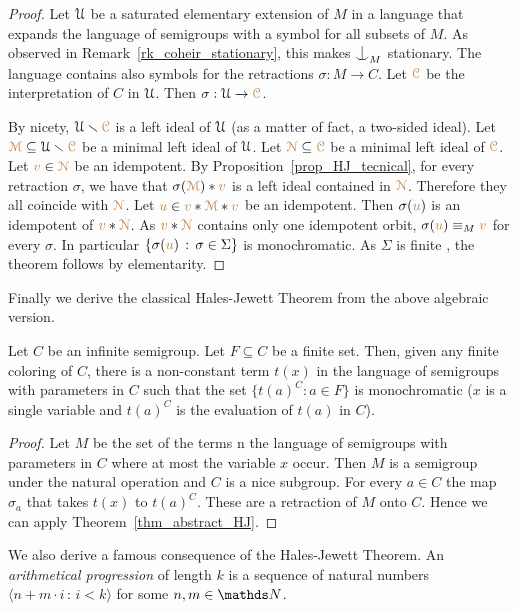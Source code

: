 \begin{proof}
Let $\EuScript U$ be a saturated elementary extension of $M$ in a language that expands the language of semigroups with a symbol for all subsets of $M$.
As observed in Remark~\ref{rk_coheir_stationary}, this makes $\nonfork_M$ stationary.
The language contains also symbols for the retractions $\sigma:M\to C$.
Let ${\color{brown}\EuScript C}$ be the interpretation of $C$ in $\EuScript U$.
Then $\sigma:\EuScript U\to{\color{brown}\EuScript C}$.

By nicety, $\EuScript U\smallsetminus{\color{brown}\EuScript C}$ is a left ideal of $\EuScript U$ (as a matter of fact, a two-sided ideal).
Let ${\color{brown}\EuScript M}\subseteq \EuScript U\smallsetminus{\color{brown}\EuScript C}$ be a minimal left ideal of $\EuScript U$.
Let ${\color{brown}\EuScript N}\subseteq{\color{brown}\EuScript C}$ be a minimal left ideal of ${\color{brown}\EuScript C}$.
Let ${\color{brown} v}\in{\color{brown}\EuScript N}$ be an idempotent.
By Proposition~\ref{prop_HJ_tecnical}, for every retraction $\sigma$, we have that $\sigma({\color{brown}\EuScript M})*{\color{brown} v}$ is a left ideal contained in ${\color{brown}\EuScript N}$.
Therefore they all coincide with ${\color{brown}\EuScript N}$.
Let ${\color{brown} u}\in{\color{brown}v}*{\color{brown}\EuScript M}*{\color{brown} v}$ be an idempotent.
Then $\sigma({\color{brown} u})$ is an idempotent of ${\color{brown} v}*{\color{brown}\EuScript N}$.
As ${\color{brown} v}*{\color{brown}\EuScript N}$ contains only one idempotent orbit, $\sigma({\color{brown} u})\equiv_M{\color{brown} v}$ for every $\sigma$.
In particular $\{\sigma({\color{brown} u})\,:\,\sigma\in\Sigma\}$ is monochromatic.
As $\Sigma$ is finite , the theorem follows by elementarity.
\end{proof}

Finally we derive the classical Hales-Jewett Theorem from the above algebraic version.

\begin{void}\label{thm_HalesJewett}
  Let $C$ be an infinite semigroup.
  Let $F\subseteq C$ be a finite set.
  Then, given any finite coloring of $C$, there is a non-constant term $t(x)$ in the language of semigroups with parameters in $C$ such that the set $\{ t(a)^C: a\in F\}$ is monochromatic ($x$ is a single variable and $t(a)^C$ is the evaluation of $t(a)$ in $C$).
\end{void}

\begin{proof}
  Let $M$ be the set of the terms n the language of semigroups with parameters in $C$ where at most the variable $x$ occur.
  Then $M$ is a semigroup under the natural operation and $C$ is a nice subgroup.
  For every $a\in C$ the map $\sigma_a$ that takes $t(x)$ to $t(a)^C$.
  These are a retraction of $M$ onto $C$.
  Hence we can apply Theorem~\ref{thm_abstract_HJ}.
\end{proof}

We also derive a famous consequence of the Hales-Jewett Theorem.
An \textit{arithmetical progression\/} of length $k$ is a sequence of natural numbers $\langle n{+}m{\cdot}i\, :\, i<k\rangle$ for some $n,m\in\NN$.

